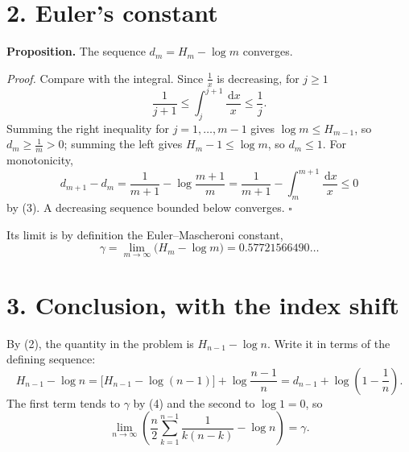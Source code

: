\documentclass[12pt]{article}
\newcommand{\dd}{\,\mathrm{d}}
\newcommand{\Hh}{H}
\begin{document}
\begin{center}
\end{center}

\section*{2. Euler's constant}

\textbf{Proposition.} The sequence \(d_m=\Hh_m-\log m\) converges.

\textit{Proof.} Compare with the integral. Since \(\frac1x\) is
decreasing, for \(j\ge1\)
\[
\frac1{j+1}\le\int_j^{j+1}\frac{\dd x}{x}\le\frac1j .
\tag{3}
\]
Summing the right inequality for \(j=1,\dots,m-1\) gives
\(\log m\le \Hh_{m-1}\), so \(d_m\ge\frac1m>0\); summing the left gives
\(\Hh_m-1\le\log m\), so \(d_m\le1\). For monotonicity,
\[
d_{m+1}-d_m=\frac1{m+1}-\log\frac{m+1}{m}
=\frac1{m+1}-\int_m^{m+1}\frac{\dd x}{x}\le0
\]
by (3). A decreasing sequence bounded below converges. \(\square\)

Its limit is by definition the Euler--Mascheroni constant,
\[
\gamma=\lim_{m\to\infty}\bigl(\Hh_m-\log m\bigr)=0.57721566490\ldots
\tag{4}
\]

\section*{3. Conclusion, with the index shift}

By (2), the quantity in the problem is \(\Hh_{n-1}-\log n\). Write it in
terms of the defining sequence:
\[
\Hh_{n-1}-\log n
=\bigl[\Hh_{n-1}-\log(n-1)\bigr]+\log\frac{n-1}{n}
=d_{n-1}+\log\left(1-\frac1n\right).
\]
The first term tends to \(\gamma\) by (4) and the second to \(\log1=0\),
so
\[
\boxed{\displaystyle
\lim_{n\to\infty}\left(\frac n2\sum_{k=1}^{n-1}\frac1{k(n-k)}-\log n\right)
=\gamma .}
\]
\end{document}
